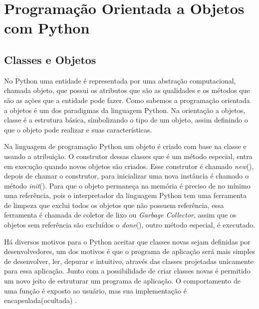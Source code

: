 

\chapter{ Programação Orientada a Objetos com Python}



    \section{Classes e Objetos}
    
	 No Python uma entidade é representada por uma abstração computacional, chamada objeto, que possui os atributos que são as qualidades e os métodos que são as ações que a entidade pode fazer. Como sabemos a programação orientada a objetos é um dos paradigmas da linguagem Python. Na orientação a objetos, classe é a estrutura básica, simbolizando o tipo de um objeto, assim definindo o que o objeto pode realizar e suas características.
	 
	 Na linguagem de programação Python um objeto é criado com base na classe e usando a atribuição. O construtor dessas classes que é um método especial, entra em execução quando novos objetos são criados. Esse construtor é chamado \textunderscore\textunderscore \textit{new}\textunderscore\textunderscore(), depois de chamar o construtor, para inicializar uma nova instância é chamado o método \textunderscore\textunderscore \textit{init}\textunderscore\textunderscore(). Para que o objeto permaneça na memória é preciso de no mínimo uma referência, pois o interpretador da linguagem Python tem uma ferramenta de limpeza que exclui todos os objetos que não possuem referência, essa ferramenta é chamada de coletor de lixo ou \textit{Garbage Collector}, assim que os objetos sem referência são excluídos o \textunderscore\textunderscore \textit{done}\textunderscore\textunderscore(), outro método especial, é executado.
	 
	Há diversos motivos para o Python aceitar que classes novas sejam definidas por desenvolvedores, um dos motivos é que o programa de aplicação será mais simples de desenvolver, ler, depurar e intuitivo, através das classes projetadas unicamente para essa aplicação. Junto com a possibilidade de criar classes novas é permitido um novo jeito de estruturar um programa de aplicação. O comportamento de uma função é exposto ao usuário, mas sua implementação é encapsulada(ocultada) \cite{Borges2014}.
	
